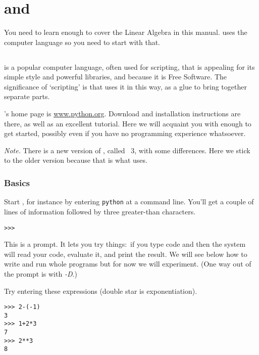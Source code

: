 \chapter{\python{} and \Sage{}}

You need to learn enough \Sage{} to cover the Linear Algebra
in this manual.
\Sage{} uses the computer language \python{} so you need to start with that.




\section{\python}
\python{} is a popular computer language, often used for scripting,
that is appealing for its simple style and powerful libraries,
and because it is Free Software.
The significance of `scripting' is that \Sage{} uses it in this way,
as a glue to bring together separate parts.

\python's home page is \href{http://www.python.org}{\url{www.python.org}}.
Download and installation instructions are there, as well as 
an excellent tutorial.
Here we will acquaint you with enough \python{} to get started, possibly
even if you have no programming experience whatsoever.

\smallskip
\textit{Note.}
There is a new version of \python{}, called \python~3, with some differences.
Here we stick to the older version 
because that is what \Sage{} uses.


\subsection{Basics}
Start \python, for instance by entering 
\lstinline[style=inline]!python!
at a command line.
You'll get a couple of lines of 
information followed by three greater-than
characters.
\begin{lstlisting}[style=python]
>>>   
\end{lstlisting}
This is a prompt.
It lets you try things:~if you type 
\python{} code and  then the system
will read your code, evaluate it, and print the result.
We will see below how to write and run whole programs
but for now we will experiment. 
(One way out of the prompt is with \textit{-D}.)

Try entering these expressions (double star is exponentiation).
\begin{lstlisting}[style=python]
>>> 2-(-1)
3
>>> 1+2*3
7
>>> 2**3
8  
\end{lstlisting}

